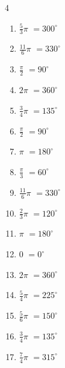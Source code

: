 \begin{multicols}{4}
\begin{enumerate}
  \item $\displaystyle \frac{5}{3}\pi$
        $\displaystyle =300^{\circ}$

  \item $\displaystyle \frac{11}{6}\pi$
        $\displaystyle =330^{\circ}$

  \item $\displaystyle \frac{\pi}{2}$
        $\displaystyle =90^{\circ}$

  \item $\displaystyle 2\pi$
        $\displaystyle =360^{\circ}$

  \item $\displaystyle \frac{3}{4}\pi$
        $\displaystyle =135^{\circ}$

  \item $\displaystyle \frac{\pi}{2}$
        $\displaystyle =90^{\circ}$

  \item $\displaystyle \pi$
        $\displaystyle =180^{\circ}$

  \item $\displaystyle \frac{\pi}{3}$
        $\displaystyle =60^{\circ}$

  \item $\displaystyle \frac{11}{6}\pi$
        $\displaystyle =330^{\circ}$

  \item $\displaystyle \frac{2}{3}\pi$
        $\displaystyle =120^{\circ}$

\columnbreak %

\resetques

  \item $\displaystyle \pi$
        $\displaystyle =180^{\circ}$

  \item $\displaystyle 0$
        $\displaystyle =0^{\circ}$

  \item $\displaystyle 2\pi$
        $\displaystyle =360^{\circ}$

  \item $\displaystyle \frac{5}{4}\pi$
        $\displaystyle =225^{\circ}$

  \item $\displaystyle \frac{5}{6}\pi$
        $\displaystyle =150^{\circ}$

  \item $\displaystyle \frac{3}{4}\pi$
        $\displaystyle =135^{\circ}$

  \item $\displaystyle \frac{7}{4}\pi$
        $\displaystyle =315^{\circ}$


\end{enumerate}
\end{multicols}
